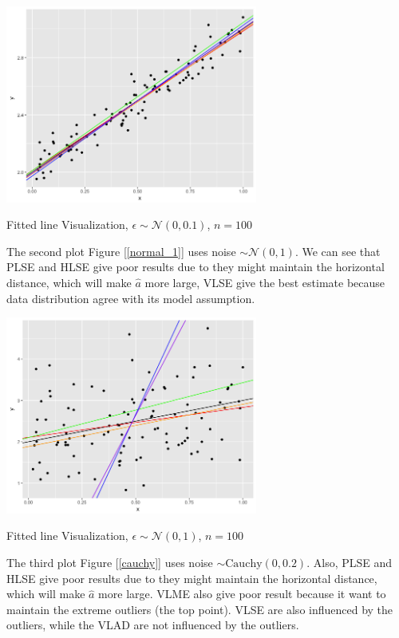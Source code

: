 \documentclass[twoside]{article}
\begin{document}
\begin{center}
\makeatletter
\def\@captype{figure}
\makeatother
\includegraphics [height=6.5cm]{code/sca/sca+normal_0.1.png}
\caption{Fitted line Visualization, $\epsilon \sim \mathcal{N}(0,0.1)$, $n=100$}
\label{normal_0.1}
\end{center}

The second plot  Figure [\ref{normal_1}] uses noise $\sim \mathcal{N}(0,1)$. We can see that PLSE and HLSE give poor results due to they might maintain
 the horizontal distance, which will make $\hat{a}$ more large, VLSE give the best estimate because data distribution agree with its model assumption.

\begin{center}
\makeatletter
\def\@captype{figure}
\makeatother
\includegraphics [height=6.5cm]{code/sca/sca+normal_1.png}
\caption{Fitted line Visualization, $\epsilon \sim \mathcal{N}(0,1)$, $n=100$}
\label{normal_1}
\end{center}

The third plot Figure [\ref{cauchy}] uses noise $\sim \mathrm{Cauchy}(0,0.2)$. Also, PLSE and HLSE give poor results due to they might maintain the horizontal distance, which will make $\hat{a}$ more large. VLME also give poor result because it want to maintain the extreme outliers (the top point). VLSE are also influenced by the outliers, while the VLAD are not influenced by the outliers.
\end{document}
